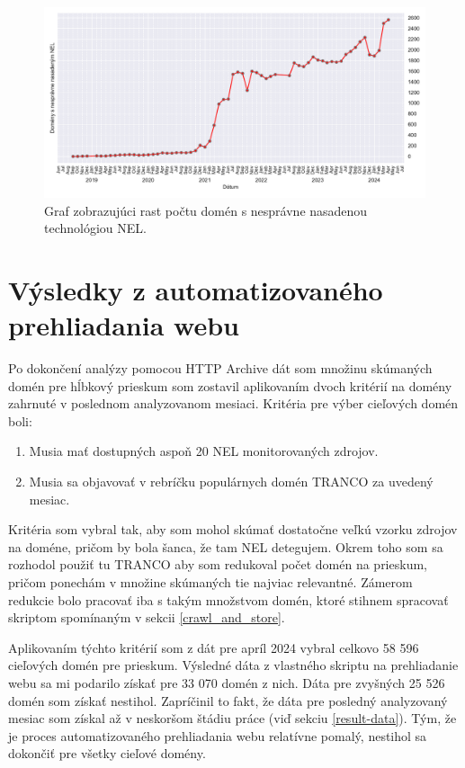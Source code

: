\begin{figure}[!htb]
\begin{center}
 \includegraphics[scale=0.59]{obrazky-figures/httparchive_nel_deployment_incorrect.pdf}
 \caption{Graf zobrazujúci rast počtu domén s nesprávne nasadenou technológiou NEL.}
 \label{fig:httparchive-nel-deployment-incorrect}
\end{center}
\end{figure}

\pagebreak


\section{Výsledky z automatizovaného prehliadania webu}
\label{crawling-results}

Po dokončení analýzy pomocou HTTP Archive dát som množinu skúmaných domén pre hĺbkový prieskum som zostavil aplikovaním dvoch kritérií na domény zahrnuté v poslednom analyzovanom mesiaci. 
Kritéria pre výber cieľových domén boli:
\begin{enumerate}
    \item Musia mať dostupných aspoň 20 NEL monitorovaných zdrojov.
    \item Musia sa objavovať v rebríčku populárnych domén TRANCO za uvedený mesiac.
\end{enumerate}
Kritéria som vybral tak, aby som mohol skúmať dostatočne veľkú vzorku zdrojov na doméne, pričom by bola šanca, že tam NEL detegujem.
Okrem toho som sa rozhodol použiť tu TRANCO aby som redukoval počet domén na prieskum, pričom ponechám v množine skúmaných tie najviac relevantné.
Zámerom redukcie bolo pracovať iba s takým množstvom domén, ktoré stihnem spracovať skriptom spomínaným v sekcii \ref{crawl_and_store}.

Aplikovaním týchto kritérií som z dát pre apríl 2024 vybral celkovo 58 596 cieľových domén pre prieskum. 
Výsledné dáta z vlastného skriptu na prehliadanie webu sa mi podarilo získať pre 33 070 domén z nich. 
Dáta pre zvyšných 25 526 domén som získať nestihol.
Zapríčinil to fakt, že dáta pre posledný analyzovaný mesiac som získal až v neskoršom štádiu práce (viď sekciu \ref{result-data}).
Tým, že je proces automatizovaného prehliadania webu relatívne pomalý, nestihol sa dokončiť pre všetky cieľové domény.

